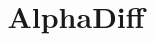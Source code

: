 \documentclass[10pt,conference]{IEEEtran}
\newcommand{\sysname}{AlphaDiff\xspace}
\begin{document}
\title{\sysname}

\maketitle















\end{document}
